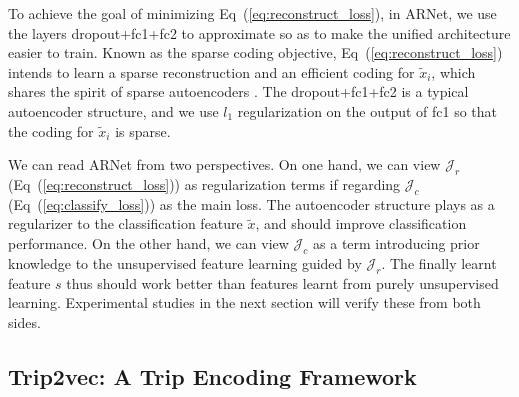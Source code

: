 \documentclass{article}
\begin{document}
To achieve the goal of minimizing Eq~(\ref{eq:reconstruct_loss}), in ARNet, we use the layers dropout+fc1+fc2 to approximate so as to make the unified architecture easier to train. Known as the sparse coding objective, Eq~(\ref{eq:reconstruct_loss}) intends to learn a sparse reconstruction and an efficient coding for $\tilde{x}_i$, which shares the spirit of sparse autoencoders \cite{ng2011sparse}.
The dropout+fc1+fc2 is a typical autoencoder structure, and we use $l_1$ regularization on the output of fc1 so that the coding for $\tilde{x}_i$ is sparse.

We can read ARNet from two perspectives.
On one hand, we can view $\mathcal{J}_r$ (Eq~(\ref{eq:reconstruct_loss})) as regularization terms if regarding $\mathcal{J}_c$ (Eq~(\ref{eq:classify_loss})) as the main loss.
The autoencoder structure plays as a regularizer to the classification feature $\tilde{x}$, and should improve classification performance.
On the other hand, we can view $\mathcal{J}_c$ as a term introducing prior knowledge to the unsupervised feature learning guided by $\mathcal{J}_r$.
The finally learnt feature $s$ thus should work better than features learnt from purely unsupervised learning.
Experimental studies in the next section will verify these from both sides.



\subsection{Trip2vec: A Trip Encoding Framework}
\label{sec:TripEncoding}
\end{document}
